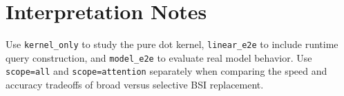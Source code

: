 \section{Interpretation Notes}
Use \texttt{kernel\_only} to study the pure dot kernel, \texttt{linear\_e2e} to include runtime query construction, and \texttt{model\_e2e} to evaluate real model behavior. Use \texttt{scope=all} and \texttt{scope=attention} separately when comparing the speed and accuracy tradeoffs of broad versus selective BSI replacement.
